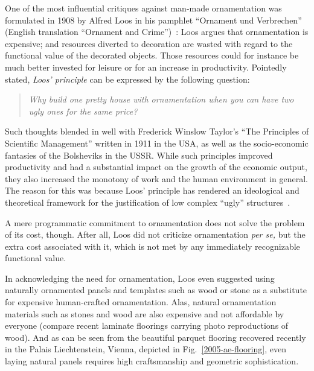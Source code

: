 \documentclass[%
 reprint,
 showpacs,
 showkeys,
 amsmath,
 amssymb,
 aps,
 pra,
 longbibliography,
 floatfix,
 ]{revtex4-1}
\begin{document}
One of the most influential critiques against man-made ornamentation was formulated in
1908 by Alfred Loos in his pamphlet ``Ornament und Verbrechen'' (English translation ``Ornament and Crime'')~\cite{loos}:
Loos argues that ornamentation is expensive; and resources diverted to decoration are wasted with regard to the functional value of the decorated objects.
Those resources could for instance be much better invested for leisure or for an increase in productivity.
Pointedly stated, {\em Loos' principle} can be expressed by the following question:
\begin{quote}
{\em
Why build one pretty house with ornamentation when you can have
two ugly ones for the same price?
}
\end{quote}

Such thoughts blended in well with Frederick Winslow Taylor's ``The
Principles of Scientific Management''
\cite{taylor-1911}  written in 1911
in the USA, as well as the socio-economic fantasies of the Bolsheviks in the USSR.
While such principles improved productivity and had a substantial impact on the growth of the economic output, they also increased the monotony of work and the human environment in general.
The reason for this was because Loos' principle has rendered an
ideological and theoretical framework for the justification of low complex ``ugly'' structures~\cite{krier-98,chan-1998}.




A mere programmatic commitment to ornamentation does not solve the problem of its cost, though.
After all, Loos did not criticize ornamentation {\em per se,} but the extra cost associated with it, which is not met by any immediately recognizable functional value.

In acknowledging the need for ornamentation, Loos even suggested using naturally ornamented panels and templates such as wood or stone as a substitute for expensive human-crafted ornamentation.
Alas, natural ornamentation materials such as stones and wood are also expensive and not affordable by everyone (compare recent laminate floorings carrying photo reproductions of wood).
And as can be seen from the beautiful parquet flooring recovered recently in the Palais
Liechtenstein, Vienna, depicted in Fig.~\ref{2005-ae-flooring},
even laying natural panels
requires high craftsmanship and geometric sophistication.
\end{document}
